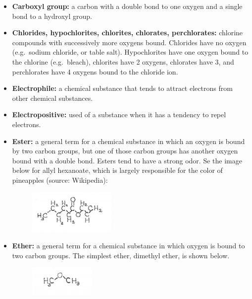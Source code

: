 \documentclass[11pt]{memoir}
\begin{document}
\begin{itemize}
\item[]{\textbf{Carboxyl group:} a carbon with a double bond to one oxygen and a single bond to a hydroxyl group.}

\item[]{\textbf{Chlorides, hypochlorites, chlorites, chlorates, perchlorates:} chlorine compounds with successively more oxygens bound.  Chlorides have no oxygen (e.g.\ sodium chloride, or table salt).  Hypochlorites have one oxygen bound to the chlorine (e.g.\ bleach), chlorites have 2 oxygens, chlorates have 3, and perchlorates have 4 oxygens bound to the chloride ion.}

\item[]{\textbf{Electrophile:} a chemical substance that tends to attract electrons from other chemical substances.}

\item[]{\textbf{Electropositive:} used of a substance when it has a tendency to repel electrons.}

\item[]{\textbf{Ester:} a general term for a chemical substance in which an oxygen is bound by two carbon groups, but one of those carbon groups has another oxygen bound with a double bond.  Esters tend to have a strong odor.  Se the image below for allyl hexanoate, which is largely responsible for the color of pineapples (source: Wikipedia):}


\begin{figure}[h]
\vspace{-15pt}
\begin{center}
\includegraphics[width=0.4\textwidth]{images/lewis_notefig6.png}
\end{center}
\vspace{-30pt}
\end{figure}


\item[]{\textbf{Ether:} a general term for a chemical substance in which oxygen is bound to two carbon groups.  The simplest ether, dimethyl ether, is shown below.}

\begin{figure}[h]
\vspace{-10pt}
\begin{center}
\includegraphics[width=0.3\textwidth]{images/lewis_notefig5.png}
\end{center}
\vspace{-30pt}
\end{figure}


\end{itemize}
\end{document}
